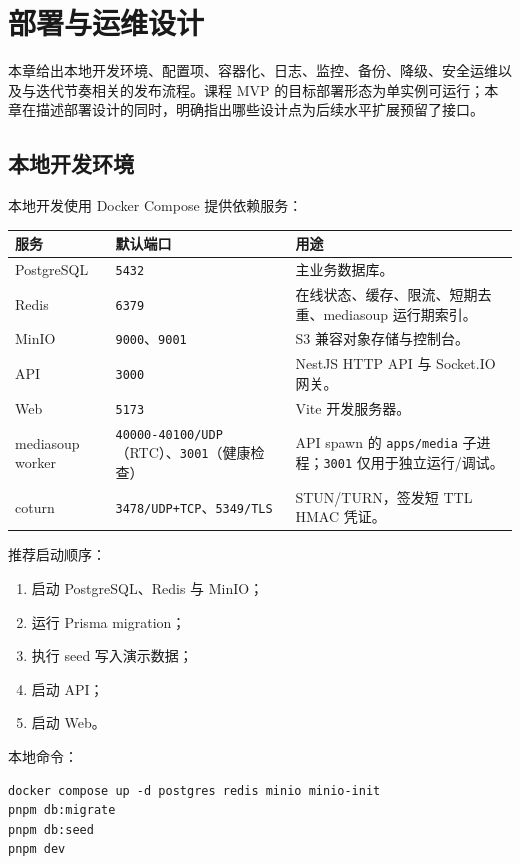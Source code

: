 \section{部署与运维设计}

本章给出本地开发环境、配置项、容器化、日志、监控、备份、降级、安全运维以及与迭代节奏相关的发布流程。课程 MVP 的目标部署形态为单实例可运行；本章在描述部署设计的同时，明确指出哪些设计点为后续水平扩展预留了接口。

\subsection{本地开发环境}

本地开发使用 Docker Compose 提供依赖服务：

\noindent\begin{tabularx}{\textwidth}{L{3cm}L{3cm}Y}
  \toprule
  服务 & 默认端口 & 用途 \\
  \midrule
  PostgreSQL & \texttt{5432} & 主业务数据库。 \\
  Redis & \texttt{6379} & 在线状态、缓存、限流、短期去重、mediasoup 运行期索引。 \\
  MinIO & \texttt{9000}、\texttt{9001} & S3 兼容对象存储与控制台。 \\
  API & \texttt{3000} & NestJS HTTP API 与 Socket.IO 网关。 \\
  Web & \texttt{5173} & Vite 开发服务器。 \\
  mediasoup worker & \texttt{40000-40100/UDP}（RTC）、\texttt{3001}（健康检查） & API spawn 的 \texttt{apps/media} 子进程；\texttt{3001} 仅用于独立运行/调试。 \\
  coturn & \texttt{3478/UDP+TCP}、\texttt{5349/TLS} & STUN/TURN，签发短 TTL HMAC 凭证。 \\
  \bottomrule
\end{tabularx}

推荐启动顺序：

\begin{enumerate}
  \item 启动 PostgreSQL、Redis 与 MinIO；
  \item 运行 Prisma migration；
  \item 执行 seed 写入演示数据；
  \item 启动 API；
  \item 启动 Web。
\end{enumerate}

本地命令：

\begin{verbatim}
docker compose up -d postgres redis minio minio-init
pnpm db:migrate
pnpm db:seed
pnpm dev
\end{verbatim}

